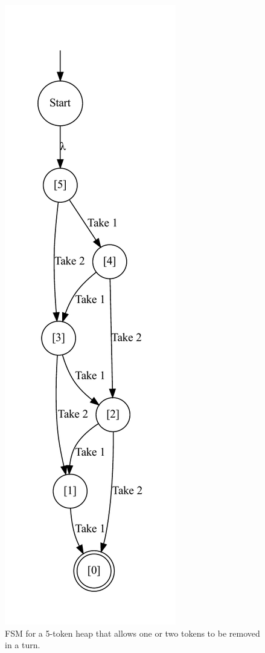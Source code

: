 \documentclass[sigplan,anonymous,review]{acmart}
\begin{document}
\begin{figure}
    \centering
    \includegraphics[width=0.55\linewidth]{figures/nimexample/heapFSM.pdf}
    \caption{FSM for a 5-token heap that allows one or two tokens to be removed in a turn.}
    \label{fig:nimHeapFSM} 
\end{figure}
\end{document}
